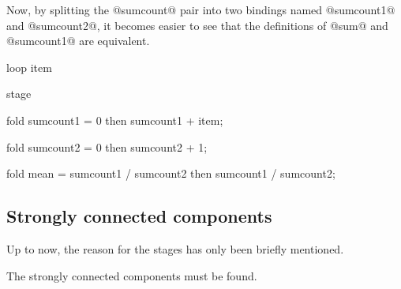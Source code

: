Now, by splitting the @sumcount@ pair into two bindings named @sumcount1@ and @sumcount2@, it becomes easier to see that the definitions of @sum@ and @sumcount1@ are equivalent.
\begin{code}
loop item {
  stage {
    fold sumcount1
     = 0
     then
       sumcount1 + item;

    fold sumcount2
     = 0
     then
       sumcount2 + 1;

    fold mean
     = sumcount1 / sumcount2
     then
       sumcount1 / sumcount2;
  }
}
\end{code}



\subsection{Strongly connected components}
Up to now, the reason for the stages has only been briefly mentioned.

The strongly connected components must be found.


